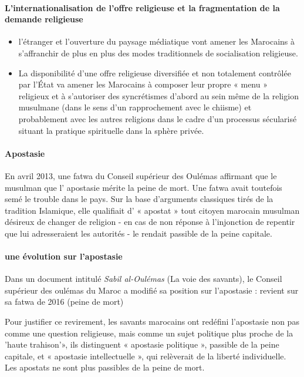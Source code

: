   \paragraph{L'internationalisation de l'offre religieuse et la fragmentation de la 
  demande religieuse}
  \begin{itemize}
      \item l'étranger et l'ouverture du paysage médiatique vont amener les Marocains à s'affranchir de plus en plus des modes traditionnels de socialisation religieuse.
      \item La disponibilité d'une offre religieuse diversifiée et non totalement contrôlée par l'État va amener les Marocains à composer leur propre « menu » religieux et à s'autoriser des syncrétismes d'abord au sein même de la religion musulmane (dans le sens d'un rapprochement avec le chiisme) et probablement avec les autres religions dans le cadre d'un processus sécularisé situant la pratique spirituelle dans la sphère privée.
  \end{itemize}


\paragraph{Apostasie}
 En avril 2013, une fatwa du Conseil supérieur des Oulémas affirmant que le musulman que l' apostasie mérite la peine de mort. 
 Une fatwa avait toutefois semé le trouble dans le pays. Sur la base d'arguments classiques tirés de la tradition Islamique, elle qualifiait d' « apostat » tout citoyen marocain musulman désireux de changer de religion - en cas de non réponse à l'injonction de repentir que lui adresseraient les autorités - le rendait passible de la peine capitale.

\paragraph{une évolution sur l'apostasie}
  Dans un document intitulé \textit{Sabil al-Oulémas} (La voie des savants), le Conseil supérieur des oulémas du Maroc a modifié sa position sur l'apostasie : revient sur sa fatwa de 2016 (peine de mort) 
  
  Pour justifier ce revirement, les savants marocains ont redéfini l'apostasie non pas comme une question religieuse, mais comme un sujet politique plus proche de la 'haute trahison'», ils distinguent « apostasie politique », passible de la peine capitale, et « apostasie intellectuelle », qui relèverait de la liberté individuelle.
Les apostats ne sont plus passibles de la peine de mort.


